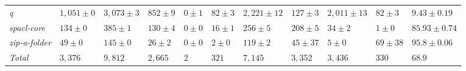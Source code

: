 \begin{table}
{\begin{tabular}[t]{lllllllllll}
\textit{q} & $1,051 \pm 0$ & $3,073 \pm 3$ & $852 \pm 9$ & $0 \pm 1$ & $82 \pm 3$ & $2,221 \pm 12$ & $127 \pm 3$ & $2,011 \pm 13$ & $82 \pm 3$ & $9.43 \pm 0.19$\\
\textit{spacl-core} & $134 \pm 0$ & $385 \pm 1$ & $130 \pm 4$ & $0 \pm 0$ & $16 \pm 1$ & $256 \pm 5$ & $208 \pm 5$ & $34 \pm 2$ & $1 \pm 0$ & $85.93 \pm 0.74$\\
\textit{zip-a-folder} & $49 \pm 0$ & $145 \pm 0$ & $26 \pm 2$ & $0 \pm 0$ & $2 \pm 0$ & $119 \pm 2$ & $45 \pm 37$ & $5 \pm 0$ & $69 \pm 38$ & $95.8 \pm 0.06$\\
\hline\textit{Total} & $3,376$ & $9,812$ & $2,665$ & $2$ & $321$ & $7,145$ & $3,352$ & $3,436$ & $330$ & $68.9$\\
\bottomrule
\end{tabular}}
\end{table}
